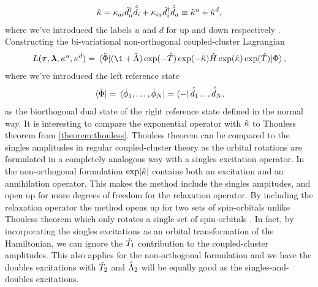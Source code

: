             \begin{align}
                \hat{\kappa}
                = \kappa_{ai} \hat{d}^{\dagger}_{a}\hat{\tilde{d}}_{i}
                + \kappa_{ia} \hat{d}^{\dagger}_{i}\hat{\tilde{d}}_{a}
                \equiv
                \hat{\kappa}^{u} + \hat{\kappa}^{d},
            \end{align}
            where we've introduced the labels $u$ and $d$ for up and down
            respectively \cite{rolf-nocc}.
            Constructing the bi-variational non-orthogonal coupled-cluster
            Lagrangian
            \begin{align}
                L(\vfg{\clustamp}, \vfg{\clustlamp}, \noccten^{u},
                \noccten^{d})
                = \mel*{\tilde{\slat}}{
                    (\1 + \clustl)
                    \exponential(-\clust)
                    \exponential(-\nocc)
                    \hamil
                    \exponential(\nocc)
                    \exponential(\clust)
                }{\slat},
                \label{eq:nocc-lagrangian}
            \end{align}
            where we've introduced the left reference state
            \begin{align}
                \bra*{\tilde{\Phi}}
                = \bra*{\tilde{\phi}_1, \dots, \tilde{\phi}_N}
                = \bra{-}\hat{\tilde{d}}_{1}\dots\hat{\tilde{d}}_{N},
            \end{align}
            as the biorthogonal dual state of the right reference state defined
            in the normal way.
            It is interesting to compare the exponential operator with $\hat{\kappa}$
            to Thouless theorem from \autoref{theorem:thouless}.
            Thouless theorem can be compared to the singles amplitudes in
            regular coupled-cluster theory as the orbital rotations are
            formulated in a completely analogous way with a singles excitation
            operator.
            In the non-orthogonal formulation $\exp[\hat{\kappa}]$ contains both an
            excitation and an annihilation operator.
            This makes the method include the singles ampitudes, and open up for
            more degrees of freedom for the relaxation operator.
            By including the relaxation operator the method opens up for two
            sets of spin-orbitals unlike Thouless theorem which only rotates a
            single set of spin-orbitals \cite{helgaker-molecular}.
            In fact, by incorporating the singles excitations as an orbital
            transformation of the Hamiltonian, we can ignore the $\hat{T}_1$
            contribution to the coupled-cluster amplitudes.
            This also applies for the non-orthogonal formulation and we have the
            doubles excitations with $\hat{T}_2$ and $\hat{\Lambda}_2$ will be equally
            good as the singles-and-doubles excitations.

